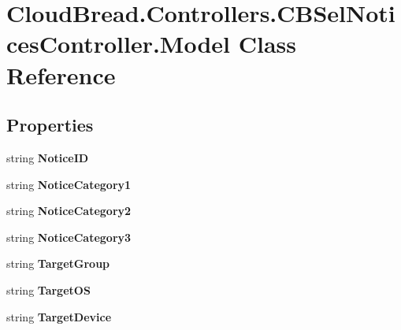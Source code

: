 \hypertarget{a00165}{}\section{Cloud\+Bread.\+Controllers.\+C\+B\+Sel\+Notices\+Controller.\+Model Class Reference}
\label{a00165}
\subsection*{Properties}
\begin{DoxyCompactItemize}
\item 
string {\bfseries Notice\+ID}\hypertarget{a00165_ad8cfa04c811d27cc8c64ad9e232a4180}{}\label{a00165_ad8cfa04c811d27cc8c64ad9e232a4180}

\item 
string {\bfseries Notice\+Category1}\hypertarget{a00165_a7d86d47577dee027d36f9ae393aec550}{}\label{a00165_a7d86d47577dee027d36f9ae393aec550}

\item 
string {\bfseries Notice\+Category2}\hypertarget{a00165_a1572d8011d4b7f1599db196f44b5bf6f}{}\label{a00165_a1572d8011d4b7f1599db196f44b5bf6f}

\item 
string {\bfseries Notice\+Category3}\hypertarget{a00165_afe8b0fa55a184a11a261470536abade3}{}\label{a00165_afe8b0fa55a184a11a261470536abade3}

\item 
string {\bfseries Target\+Group}\hypertarget{a00165_a6d376d08011bddb9d6340296a7f5550f}{}\label{a00165_a6d376d08011bddb9d6340296a7f5550f}

\item 
string {\bfseries Target\+OS}\hypertarget{a00165_a0c7eb27ea20d7329255cb21b5685a4e4}{}\label{a00165_a0c7eb27ea20d7329255cb21b5685a4e4}

\item 
string {\bfseries Target\+Device}\hypertarget{a00165_a96d497c2355efb54050aa9330d23f6b2}{}\label{a00165_a96d497c2355efb54050aa9330d23f6b2}


\end{DoxyCompactItemize}
